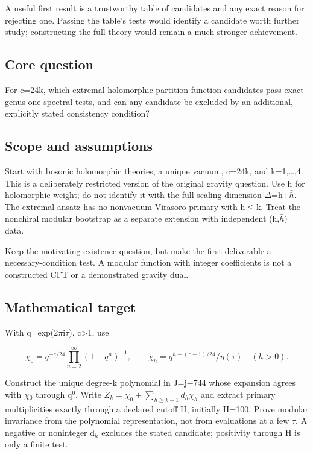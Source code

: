 \documentclass[
  11pt,
]{article}
\begin{document}
A useful first result is a trustworthy table of candidates and any exact
reason for rejecting one. Passing the table's tests would identify a
candidate worth further study; constructing the full theory would remain
a much stronger achievement.

\subsection{Core question}

For c=24k, which extremal holomorphic partition-function candidates pass
exact genus-one spectral tests, and can any candidate be excluded by an
additional, explicitly stated consistency condition?

\subsection{Scope and assumptions}

Start with bosonic holomorphic theories, a unique vacuum, c=24k, and
k=1,\ldots,4. This is a deliberately restricted version of the original
gravity question. Use h for holomorphic weight; do not identify it with
the full scaling dimension \ensuremath{\Delta}=h+\ensuremath{\bar{h}}.
The extremal ansatz has no nonvacuum Virasoro primary with
h\ensuremath{\le}k. Treat the nonchiral modular bootstrap as a separate
extension with independent (h,\ensuremath{\bar{h}}) data.

Keep the motivating existence question, but make the first deliverable a
necessary-condition test. A modular function with integer coefficients
is not a constructed CFT or a demonstrated gravity dual.

\subsection{Mathematical target}

With q=exp(2\ensuremath{\pi}i\ensuremath{\tau}), c\textgreater1, use

\[\chi _0=q^{-c/24}\prod_{n=2}^{\infty }(1-q^n)^{-1},\qquad \chi _h=q^{h-(c-1)/24}/\eta (\tau )\quad(h>0).\]

Construct the unique degree-k polynomial in J=j\ensuremath{-}744 whose
expansion agrees with \ensuremath{\chi}\ensuremath{{}_{0}} through
q\ensuremath{{}^{0}}. Write \(Z_k=\chi_0+\sum_{h\ge k+1}d_h\chi_h\) and
extract primary multiplicities exactly through a declared cutoff H,
initially H=100. Prove modular invariance from the polynomial
representation, not from evaluations at a few \ensuremath{\tau}. A
negative or noninteger d\ensuremath{{}_{h}} excludes the stated
candidate; positivity through H is only a finite test.
\end{document}
